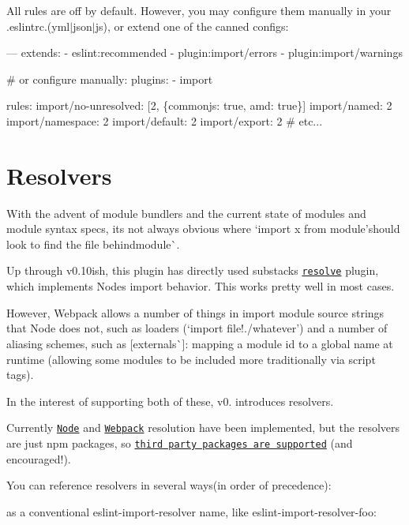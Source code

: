 All rules are off by default. However, you may configure them manually in your {\ttfamily .eslintrc.(yml$\vert$json$\vert$js)}, or extend one of the canned configs\+:


\begin{DoxyCode}
---
extends:
  - eslint:recommended
  - plugin:import/errors
  - plugin:import/warnings

# or configure manually:
plugins:
  - import

rules:
  import/no-unresolved: [2, \{commonjs: true, amd: true\}]
  import/named: 2
  import/namespace: 2
  import/default: 2
  import/export: 2
  # etc...
\end{DoxyCode}


\section*{Resolvers}

With the advent of module bundlers and the current state of modules and module syntax specs, it\textquotesingle{}s not always obvious where `import x from \textquotesingle{}module'{\ttfamily should look to find the file behind}module\`{}.

Up through v0.\+10ish, this plugin has directly used substack\textquotesingle{}s \href{https://www.npmjs.com/package/resolve}{\tt {\ttfamily resolve}} plugin, which implements Node\textquotesingle{}s import behavior. This works pretty well in most cases.

However, Webpack allows a number of things in import module source strings that Node does not, such as loaders (`import \textquotesingle{}file!./whatever'{\ttfamily ) and a number of aliasing schemes, such as \mbox{[}}externals\`{}\mbox{]}\+: mapping a module id to a global name at runtime (allowing some modules to be included more traditionally via script tags).

In the interest of supporting both of these, v0. introduces resolvers.

Currently \href{https://www.npmjs.com/package/eslint-import-resolver-node}{\tt Node} and \href{https://www.npmjs.com/package/eslint-import-resolver-webpack}{\tt Webpack} resolution have been implemented, but the resolvers are just npm packages, so \href{https://github.com/benmosher/eslint-plugin-import/wiki/Resolvers}{\tt third party packages are supported} (and encouraged!).

You can reference resolvers in several ways(in order of precedence)\+:


\begin{DoxyItemize}
\item as a conventional {\ttfamily eslint-\/import-\/resolver} name, like {\ttfamily eslint-\/import-\/resolver-\/foo}\+:
\end{DoxyItemize}



